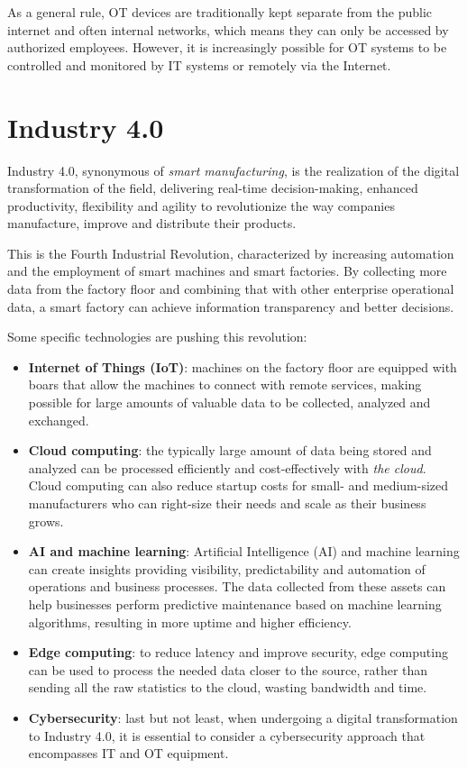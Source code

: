 As a general rule, OT devices are traditionally kept separate from the public internet and often internal networks, which means they can only be accessed by authorized employees. However, it is increasingly possible for OT systems to be controlled and monitored by IT systems or remotely via the Internet.~\cite{it-vs-ot-cybersecurity}

\section{Industry 4.0}

Industry 4.0, synonymous of \textit{smart manufacturing}, is the realization of the digital transformation of the field, delivering real-time decision-making, enhanced productivity, flexibility and agility to revolutionize the way companies manufacture, improve and distribute their products.

This is the Fourth Industrial Revolution, characterized by increasing automation and the employment of smart machines and smart factories. By collecting more data from the factory floor and combining that with other enterprise operational data, a smart factory can achieve information transparency and better decisions.

Some specific technologies are pushing this revolution:~\cite{what-is-industry-4-0}
\begin{itemize}
  \item \textbf{Internet of Things (IoT)}: machines on the factory floor are equipped with boars that allow the machines to connect with remote services, making possible for large amounts of valuable data to be collected, analyzed and exchanged.
  \item \textbf{Cloud computing}: the typically large amount of data being stored and analyzed can be processed efficiently and cost-effectively with \textit{the cloud}. Cloud computing can also reduce startup costs for small- and medium-sized manufacturers who can right-size their needs and scale as their business grows.
  \item \textbf{AI and machine learning}: Artificial Intelligence (AI) and machine learning can create insights providing visibility, predictability and automation of operations and business processes. The data collected from these assets can help businesses perform predictive maintenance based on machine learning algorithms, resulting in more uptime and higher efficiency.
  \item \textbf{Edge computing}: to reduce latency and improve security, edge computing can be used to process the needed data closer to the source, rather than sending all the raw statistics to the cloud, wasting bandwidth and time.
  \item \textbf{Cybersecurity}: last but not least, when undergoing a digital transformation to Industry 4.0, it is essential to consider a cybersecurity approach that encompasses IT and OT equipment.
\end{itemize}

